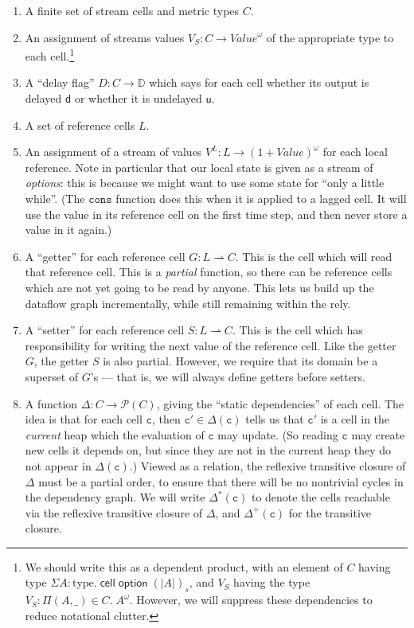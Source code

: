 \documentclass[nocopyrightspace,preprint]{sigplanconf}
\newcommand{\term}[1]{\ensuremath{\mathtt{{#1}}}}
\newcommand{\interps}[1]{(\!|{#1}|\!)_s}
\newcommand{\celltype}[1]{\mathsf{cell}\;{#1}}
\newcommand{\opttype}[1]{\mathsf{option}\;{#1}}
\newcommand{\powerset}[1]{\mathcal{P}(#1)}
\newcommand{\Delays}{\mathbb{D}}
\newcommand{\U}{\mathsf{u}}
\newcommand{\D}{\mathsf{d}}
\begin{document}
\begin{enumerate}
\item A finite set of stream cells and metric types $C$. 
\item An assignment of streams values $V_S : C \to \mathit{Value}^\omega$ 
  of the appropriate type to each cell.\footnote{We should write this 
  as a dependent product, with an element of $C$ having type 
  $\Sigma A:\mathrm{type}.\;\celltype{\opttype{\interps{A}}}$, and $V_S$ having
  the type $V_S : \Pi (A, \_) \in C.\; A^\omega$. However, we will suppress these 
  dependencies to reduce notational clutter.}
\item A ``delay flag'' $D : C \to \Delays$ which says for each cell whether 
  its output is delayed $\D$ or whether it is undelayed $\U$. 
\item A set of reference cells $L$. 
\item An assignment of a stream of values $V^L : L \to \mathit{(1 +
  \mathit{Value})^\omega}$ for each local reference. Note in
  particular that our local state is given as a stream of
  \emph{options}: this is because we might want to use some state for
  ``only a little while''. (The \term{cons} function does this when it
  is applied to a lagged cell. It will use the value in its reference cell
  on the first time step, and then never store a value in it again.)
\item A ``getter'' for each reference cell $G : L \rightharpoonup
  C$. This is the cell which will read that reference cell. This is a
  \emph{partial} function, so  there can be reference
  cells which are not yet going to be read by anyone. This lets us
  build up the dataflow graph incrementally, while still remaining
  within the rely.
\item A ``setter'' for each reference cell $S : L \rightharpoonup
  C$. This is the cell which has responsibility for writing the next
  value of the reference cell. Like the getter $G$, the getter $S$ is
  also partial. However, we require that its domain be a superset of $G$'s ---
  that is, we will always define getters before setters. 

\item A function $\Delta : C \to \powerset{C}$, giving the ``static
  dependencies'' of each cell. The idea is that for each cell
  \term{c}, then $\term{c'} \in \Delta(\term{c})$ tells us that
  \term{c'} is a cell in the \emph{current} heap which the evaluation
  of \term{c} may update. (So reading \term{c} may create new cells it
  depends on, but since they are not in the current heap they do not
  appear in $\Delta(\term{c})$.)  Viewed as a relation, the reflexive
  transitive closure of $\Delta$ must be a partial order, to ensure
  that there will be no nontrivial cycles in the dependency graph. We
  will write $\Delta^{*}(\term{c})$ to denote the cells reachable via
  the reflexive transitive closure of $\Delta$, and $\Delta^{+}(\term{c})$
  for the transitive closure.  


\end{enumerate}
\end{document}
